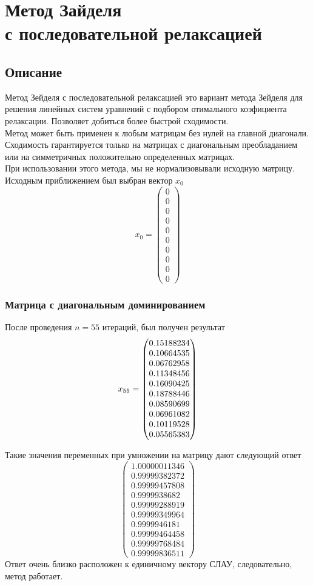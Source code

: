 \documentclass[../../report.tex]{subfiles}
\begin{document}
\chapter[Метод Зайделя с последовательной релаксацией]{\texorpdfstring{Метод Зайделя \\ 
с последовательной релаксацией}{Метод Зайделя с последовательной релаксацией}}

\section{Описание}
Метод Зейделя с последовательной релаксацией это вариант метода Зейделя для решения линейных систем 
уравнений с подбором отимального коэфициента релаксации. Позволяет добиться  более быстрой сходимости. \\

Метод может быть применен к любым матрицам без нулей на главной диагонали. Сходимость гарантируется только на
матрицах с диагональным преобладанием или на симметричных положительно определенных матрицах. \\

При использовании этого метода, мы не нормализовывали исходную матрицу. \\

Исходным приближением был выбран вектор $x_0$ 
\[
x_0 = \begin{pmatrix}
    0 \\ 
    0 \\ 
    0 \\ 
    0 \\ 
    0 \\ 
    0 \\ 
    0 \\ 
    0 \\ 
    0 \\ 
    0 
\end{pmatrix}
\]

\subsection{Матрица с диагональным доминированием}
После проведения $n=55$ итераций, был получен результат
\[
x_{55} = \begin{pmatrix} 0.15188234 \\ 0.10664535 \\ 0.06762958 \\ 0.11348456 \\ 0.16090425 \\ 0.18788446 \\ 0.08590699 \\ 0.06961082 \\ 0.10119528 \\ 0.05565383 \end{pmatrix}
\]

Такие значения переменных при умножении на матрицу дают следующий ответ
\[
\begin{pmatrix}
    1.00000011346 \\
    0.99999382372 \\
    0.99999457808 \\
    0.9999938682 \\
    0.99999288919 \\
    0.99999349964 \\
    0.9999946181 \\
    0.99999464458 \\
    0.99999768484 \\
    0.99999836511
\end{pmatrix}
\]
Ответ очень близко расположен к единичному вектору СЛАУ, следовательно, метод работает.
\end{document}
